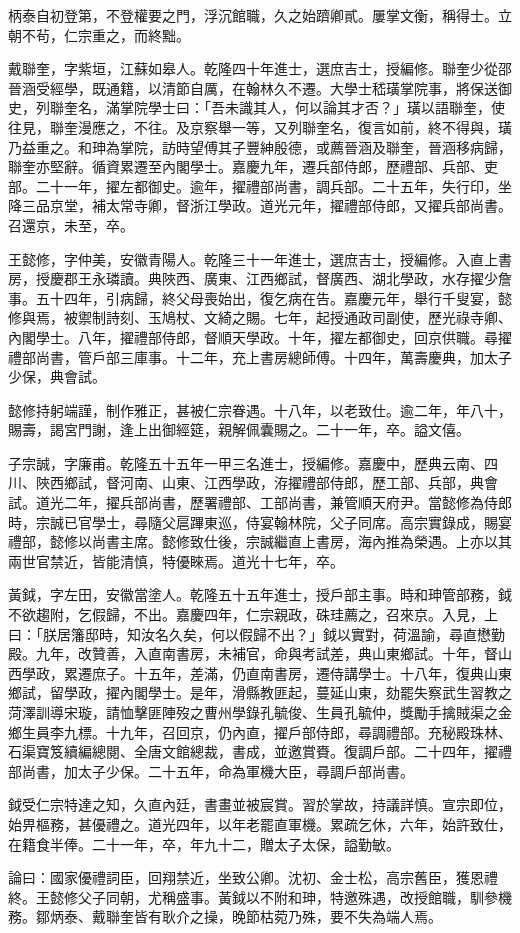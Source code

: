 \begin{pinyinscope}
柄泰自初登第，不登權要之門，浮沉館職，久之始躋卿貳。屢掌文衡，稱得士。立朝不茍，仁宗重之，而終黜。

戴聯奎，字紫垣，江蘇如皋人。乾隆四十年進士，選庶吉士，授編修。聯奎少從邵晉涵受經學，既通籍，以清節自厲，在翰林久不遷。大學士嵇璜掌院事，將保送御史，列聯奎名，滿掌院學士曰：「吾未識其人，何以論其才否？」璜以語聯奎，使往見，聯奎漫應之，不往。及京察舉一等，又列聯奎名，復言如前，終不得與，璜乃益重之。和珅為掌院，訪時望傅其子豐紳殷德，或薦晉涵及聯奎，晉涵移病歸，聯奎亦堅辭。循資累遷至內閣學士。嘉慶九年，遷兵部侍郎，歷禮部、兵部、吏部。二十一年，擢左都御史。逾年，擢禮部尚書，調兵部。二十五年，失行印，坐降三品京堂，補太常寺卿，督浙江學政。道光元年，擢禮部侍郎，又擢兵部尚書。召還京，未至，卒。

王懿修，字仲美，安徽青陽人。乾隆三十一年進士，選庶吉士，授編修。入直上書房，授慶郡王永璘讀。典陜西、廣東、江西鄉試，督廣西、湖北學政，水存擢少詹事。五十四年，引病歸，終父母喪始出，復乞病在告。嘉慶元年，舉行千叟宴，懿修與焉，被禦制詩刻、玉鳩杖、文綺之賜。七年，起授通政司副使，歷光祿寺卿、內閣學士。八年，擢禮部侍郎，督順天學政。十年，擢左都御史，回京供職。尋擢禮部尚書，管戶部三庫事。十二年，充上書房總師傅。十四年，萬壽慶典，加太子少保，典會試。

懿修持躬端謹，制作雅正，甚被仁宗眷遇。十八年，以老致仕。逾二年，年八十，賜壽，謁宮門謝，逢上出御經筵，親解佩囊賜之。二十一年，卒。謚文僖。

子宗誠，字廉甫。乾隆五十五年一甲三名進士，授編修。嘉慶中，歷典云南、四川、陜西鄉試，督河南、山東、江西學政，洊擢禮部侍郎，歷工部、兵部，典會試。道光二年，擢兵部尚書，歷署禮部、工部尚書，兼管順天府尹。當懿修為侍郎時，宗誠已官學士，尋隨父扈蹕東巡，侍宴翰林院，父子同席。高宗實錄成，賜宴禮部，懿修以尚書主席。懿修致仕後，宗誠繼直上書房，海內推為榮遇。上亦以其兩世官禁近，皆能清慎，特優睞焉。道光十七年，卒。

黃鉞，字左田，安徽當塗人。乾隆五十五年進士，授戶部主事。時和珅管部務，鉞不欲趨附，乞假歸，不出。嘉慶四年，仁宗親政，硃珪薦之，召來京。入見，上曰：「朕居籓邸時，知汝名久矣，何以假歸不出？」鉞以實對，荷溫諭，尋直懋勤殿。九年，改贊善，入直南書房，未補官，命與考試差，典山東鄉試。十年，督山西學政，累遷庶子。十五年，差滿，仍直南書房，遷侍講學士。十八年，復典山東鄉試，留學政，擢內閣學士。是年，滑縣教匪起，蔓延山東，劾罷失察武生習教之菏澤訓導宋璇，請恤擊匪陣歿之曹州學錄孔毓俊、生員孔毓仲，獎勵手擒賊渠之金鄉生員李九標。十九年，召回京，仍內直，擢戶部侍郎，尋調禮部。充秘殿珠林、石渠寶笈續編總閱、全唐文館總裁，書成，並邀賞賚。復調戶部。二十四年，擢禮部尚書，加太子少保。二十五年，命為軍機大臣，尋調戶部尚書。

鉞受仁宗特達之知，久直內廷，書畫並被宸賞。習於掌故，持議詳慎。宣宗即位，始畀樞務，甚優禮之。道光四年，以年老罷直軍機。累疏乞休，六年，始許致仕，在籍食半俸。二十一年，卒，年九十二，贈太子太保，謚勤敏。

論曰：國家優禮詞臣，回翔禁近，坐致公卿。沈初、金士松，高宗舊臣，獲恩禮終。王懿修父子同朝，尤稱盛事。黃鉞以不附和珅，特邀殊遇，改授館職，馴參機務。鄒炳泰、戴聯奎皆有耿介之操，晚節枯菀乃殊，要不失為端人焉。


\end{pinyinscope}